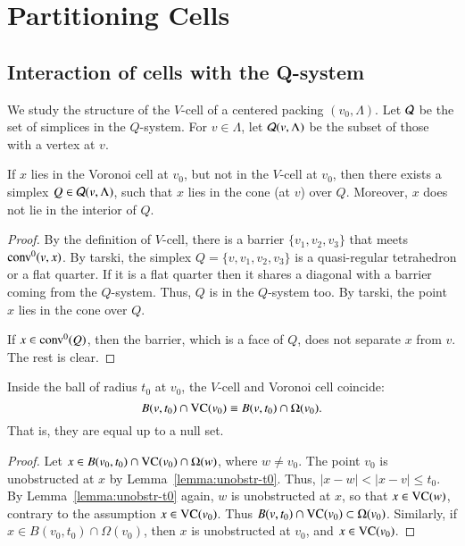 \chapter{Partitioning Cells}%
    \label{sec:fine}

\section{Interaction of cells with the Q-system}

We study the structure of the $V$-cell of a centered packing $(v_0,\Lambda)$.
Let ${\mathcal Q}$ be the set of simplices
in the $Q$-system.  For $v\in\Lambda$, let ${\mathcal Q}(v,\Lambda)$ be the subset
of those with a vertex at $v$.



\begin{lemma} \label{lemma:voronoi-truncation-over-Q}
If $x$ lies in the  Voronoi cell at $v_0$, 
but not in the $V$-cell at $v_0$, then there exists a
simplex $Q\in{\mathcal Q}(v,\Lambda)$, such that $x$ lies in the cone (at $v$)
over $Q$. Moreover, $x$ does not lie in the interior of $Q$.
\end{lemma}

\begin{proof}
By
the definition of $V$-cell, there is a barrier $\{v_1,v_2,v_3\}$
that meets ${\operatorname{conv}}^0(v,x)$.  
By tarski,
the simplex $Q=\{v,v_1,v_2,v_3\}$ is a quasi-regular tetrahedron
or a flat quarter.  If it is a flat quarter then it shares a diagonal
with a barrier coming from the $Q$-system.  Thus, $Q$ is in
the $Q$-system too.  By tarski, the
point $x$ lies in the cone over $Q$.

If $x\in{\operatorname{conv}}^0(Q)$, then the barrier, which is a face
of $Q$, does not separate
$x$ from $v$.  The rest is clear.
\end{proof}



\begin{lemma}\label{lemma:VC-Omega}
Inside the ball of radius $t_0$ at $v_0$, the $V$-cell and
Voronoi cell coincide:
   $$B(v,t_0)\cap {\operatorname{VC}}(v_0) \equiv B(v,t_0)\cap \Omega(v_0).$$
That is, they are equal up to a null set.
\end{lemma}

\begin{proof} Let $x\in B(v_0,t_0)\cap {\operatorname{VC}}(v_0)\cap\Omega(w)$, where
$w\ne v_0$.  
The point $v_0$ is
unobstructed  at $x$ by Lemma~\ref{lemma:unobstr-t0}.  
Thus, $|x-w|< |x-v|\le t_0$.  By
Lemma~\ref{lemma:unobstr-t0} again, $w$ is unobstructed at $x$, so
that $x\in {\operatorname{VC}}(w)$, contrary to the assumption
$x\in{\operatorname{VC}}(v_0)$.  Thus $B(v,t_0)\cap{\operatorname{VC}}(v_0)\subset\Omega(v_0)$.
Similarly, if $x\in B(v_0,t_0)\cap \Omega(v_0)$, then $x$ is
unobstructed at $v_0$, and $x\in {\operatorname{VC}}(v_0)$.
\end{proof}

